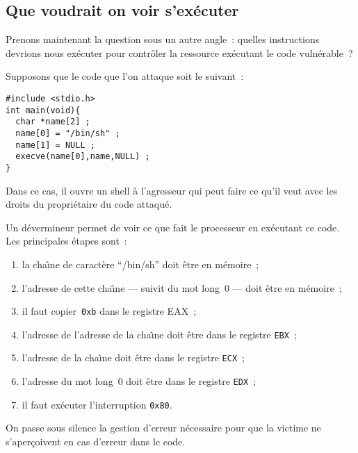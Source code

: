 \begin{frame}
  \section{Que voudrait on voir s'ex\'ecuter}%
  Prenons  maintenant   la  question sous   un   autre angle~: quelles
  instructions devrions nous ex\'ecuter  pour contr\^oler la ressource
  ex\'ecutant le code vuln\'erable~?
  \par
  Supposons que le code que l'on attaque soit le suivant~:
\begin{verbatim}
#include <stdio.h>
int main(void){
  char *name[2] ;
  name[0] = "/bin/sh" ;
  name[1] = NULL ;
  execve(name[0],name,NULL) ;
}
\end{verbatim}
  Dans ce cas,  il ouvre un shell   \`a l'agresseur qui  peut faire ce
  qu'il veut avec les droits du propri\'etaire du code attaqu\'e.
  \par
  Un  d\'evermineur  permet  de  voir  ce  que  fait le  processeur en
  ex\'ecutant ce code.
  \newpage
  Les principales \'etapes sont~:
  \begin{enumerate}
  \item la cha\^\i{}ne de caract\`ere ``/bin/sh'' doit \^etre en m\'emoire~;
  \item l'adresse de cette cha\^\i{}ne --- suivit  du mot long~$0$ ---
    doit \^etre en m\'emoire~;
  \item il faut copier~\texttt{0xb} dans le registre EAX~;
  \item l'adresse de l'adresse de  la cha\^\i{}ne doit \^etre dans  le
    registre \texttt{EBX}~;
  \item l'adresse de  la cha\^\i{}ne doit \^etre dans  le
    registre \texttt{ECX}~;
  \item l'adresse du   mot long~$0$  doit   \^etre  dans le   registre
    \texttt{EDX}~;
  \item il faut ex\'ecuter l'interruption \texttt{0x80}.
  \end{enumerate}
  On passe  sous silence la gestion  d'erreur n\'ecessaire pour que la
  victime ne s'aper\c{c}oivent en cas d'erreur dans le code.
\end{frame}
